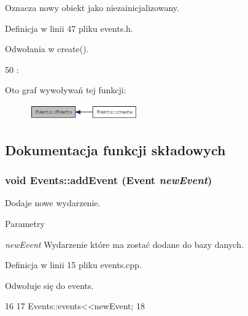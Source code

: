 Oznacza nowy obiekt jako niezainicjalizowany. 



Definicja w linii 47 pliku events.h.



Odwołania w create().




\begin{DoxyCode}
50 :
\end{DoxyCode}




Oto graf wywoływań tej funkcji:\nopagebreak
\begin{figure}[H]
\begin{center}
\leavevmode
\includegraphics[width=133pt]{classEvents_aab651428bab6b09db3564753afb225a6_icgraph}
\end{center}
\end{figure}




\subsection{Dokumentacja funkcji składowych}
\hypertarget{classEvents_afb346fb0339e89dd2093dec8f0620da7}{
\subsubsection[{addEvent}]{\setlength{\rightskip}{0pt plus 5cm}void Events::addEvent ({\bf Event} {\em newEvent})}}
\label{classEvents_afb346fb0339e89dd2093dec8f0620da7}


Dodaje nowe wydarzenie. 


\begin{DoxyParams}{Parametry}
\item[{\em newEvent}]Wydarzenie które ma zostać dodane do bazy danych. \end{DoxyParams}


Definicja w linii 15 pliku events.cpp.



Odwołuje się do events.




\begin{DoxyCode}
16 {
17     Events::events<<newEvent;
18 }
\end{DoxyCode}


